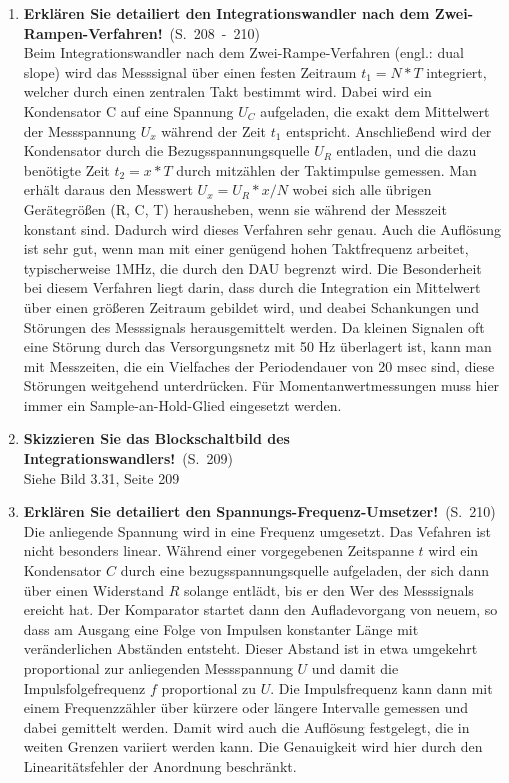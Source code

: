 \documentclass[a4paper,12pt]{article}
\newcommand{\statement}[3]{\pagebreak[3]\item {\textbf{#1!}}\ (S.\ #2)#3}
\newcommand{\normaltext}[1]{\\#1}
\newcommand{\page}[1]{#1}
\newcommand{\pages}[2]{#1\ -\ #2}
\begin{document}
\begin{enumerate}
  \statement{Erklären Sie detailiert den Integrationswandler nach dem Zwei-Rampen-Verfahren}{\pages{208}{210}}
  {
    \normaltext{Beim Integrationswandler nach dem Zwei-Rampe-Verfahren (engl.: dual slope) wird
                das Messsignal über einen festen Zeitraum $t_1 = N*T$ integriert, welcher durch
                einen zentralen Takt bestimmt wird. Dabei wird ein Kondensator C auf eine Spannung
                $U_C$ aufgeladen, die exakt dem Mittelwert der Messspannung $U_x$ während der Zeit $t_1$
                entspricht. Anschließend wird der Kondensator durch die Bezugsspannungsquelle $U_R$
                entladen, und die dazu benötigte Zeit $t_2 = x*T$ durch mitzählen der Taktimpulse gemessen.
                Man erhält daraus den Messwert $U_x = U_R * x/N$ wobei sich alle übrigen Gerätegrößen
                (R, C, T) herausheben, wenn sie während der Messzeit konstant sind. Dadurch wird dieses
                Verfahren sehr genau. Auch die Auflösung ist sehr gut, wenn man mit einer genügend hohen
                Taktfrequenz arbeitet, typischerweise 1MHz, die durch den DAU begrenzt wird. Die Besonderheit
                bei diesem Verfahren liegt darin, dass durch die Integration ein Mittelwert über einen größeren
                Zeitraum gebildet wird, und deabei Schankungen und Störungen des Messsignals herausgemittelt
                werden. Da kleinen Signalen oft eine Störung durch das Versorgungsnetz mit 50 Hz überlagert ist,
                kann man mit Messzeiten, die ein Vielfaches der Periodendauer von 20 msec sind, diese Störungen
                weitgehend unterdrücken. Für Momentanwertmessungen muss hier immer ein Sample-an-Hold-Glied
                eingesetzt werden.}
  }

  \statement{Skizzieren Sie das Blockschaltbild des Integrationswandlers}{\page{209}}
  {
    \normaltext{Siehe Bild 3.31, Seite 209}
  }

  \statement{Erklären Sie detailiert den Spannungs-Frequenz-Umsetzer}{\page{210}}
  {
    \normaltext{Die anliegende Spannung wird in eine Frequenz umgesetzt. Das Vefahren ist
                nicht besonders linear. Während einer vorgegebenen Zeitspanne $t$ wird
                ein Kondensator $C$ durch eine bezugsspannungsquelle aufgeladen, der sich
                dann über einen Widerstand $R$ solange entlädt, bis er den Wer des Messsignals
                ereicht hat. Der Komparator startet dann den Aufladevorgang von neuem, so dass
                am Ausgang eine Folge von Impulsen konstanter Länge mit veränderlichen Abständen
                entsteht. Dieser Abstand ist in etwa umgekehrt proportional zur anliegenden
                Messspannung $U$ und damit die Impulsfolgefrequenz $f$ proportional zu $U$.
                Die Impulsfrequenz kann dann mit einem Frequenzzähler über kürzere oder
                längere Intervalle gemessen und dabei gemittelt werden. Damit wird auch die
                Auflösung festgelegt, die in weiten Grenzen variiert werden kann. Die Genauigkeit
                wird hier durch den Linearitätsfehler der Anordnung beschränkt.}
  }


\end{enumerate}
\end{document}
